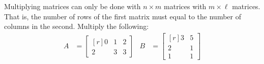     \newpage
    \begin{problem}
        Multiplying matrices can only be done with $n\times{m}$ matrices
        with $m\times\ell$ matrices. That is, the number of rows of the
        first matrix must equal to the number of columns in the second.
        Multiply the following:
        \begin{align*}
            A&=
            \begin{bmatrix*}[r]
                0&1&2\\
                2&3&3
            \end{bmatrix*}
            &
            B&=
            \begin{bmatrix*}[r]
                3&5\\
                2&1\\
                1&1
            \end{bmatrix*}
        \end{align*}
        \par\hfill\par
    \end{problem}